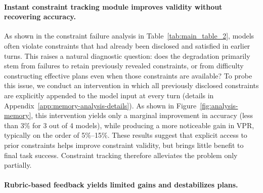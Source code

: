 \paragraph{Instant constraint tracking module improves validity without recovering accuracy.}
As shown in the constraint failure analysis in Table~\ref{tab:main_table_2}, models often violate constraints that had already been disclosed and satisfied in earlier turns. 
This raises a natural diagnostic question: does the degradation primarily stem from failures to retain previously revealed constraints, or from difficulty constructing effective plans even when those constraints are available?
To probe this issue, we conduct an intervention in which all previously disclosed constraints are explicitly appended to the model input at every turn (details in Appendix~\ref{app:memory-analysis-details}). As shown in Figure~\ref{fig:analysis-memory}, this intervention yields only a marginal improvement in accuracy (less than 3\% for 3 out of 4 models), while producing a more noticeable gain in VPR, typically on the order of 5\%--15\%. 
These results suggest that explicit access to prior constraints helps improve constraint validity, but brings little benefit to final task success. 
Constraint tracking therefore alleviates the problem only partially.

\paragraph{Rubric-based feedback yields limited gains and destabilizes plans.}


